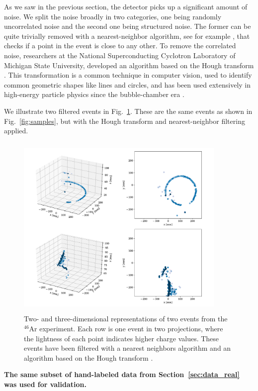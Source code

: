 \documentclass[review,sort&compress]{elsarticle}
\begin{document}
As we saw in the previous section, the detector picks up a significant amount of noise. We split the noise broadly in two categories,  one being randomly uncorrelated noise and the second one being structured noise. The former can be quite trivially removed with a nearest-neighbor algorithm, see for example \cite{hastie2009}, that checks if a point in the event is close to any other. To remove the correlated noise, researchers at the National Superconducting Cyclotron Laboratory of Michigan State University, developed an algorithm based on the Hough transform \cite{Newman1972}. This transformation is a common technique in computer vision, used to identify common geometric shapes like lines and circles, and has been used extensively in high-energy particle physics since the bubble-chamber era \cite{Hough:1959}.  %

We illustrate two filtered events in Fig.~\ref{fig:samples_filtered}. These are the same events as shown in Fig.~\ref{fig:samples}, but with the Hough transform and nearest-neighbor filtering applied. 

\begin{figure}[ht]
\centering
\includegraphics[width=0.9\textwidth, height=9cm]{custom_work/examples_filtered.pdf}
\caption[Displaying filtered events in 2D and 3D]{Two- and three-dimensional representations of two events from the ${}^{46}$Ar experiment. Each row is one event in two projections, where the lightness of each point indicates higher charge values. These events have been filtered with a nearest neighbors algorithm and an algorithm based on the Hough transform \cite{Newman1972}.}\label{fig:samples_filtered}
\end{figure}
{\bf The same subset of hand-labeled data from Section~\ref{sec:data_real} was used for validation.}
\end{document}
